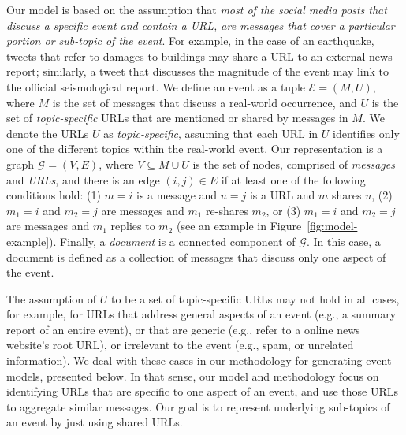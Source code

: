 Our model is based on the assumption that {\em most of the social media posts
that discuss a specific event and contain a URL, are messages that cover a
particular portion or sub-topic of the event}.
%
For example, in the case of an earthquake, tweets that refer to damages to
buildings may share a URL to an external news report; similarly, a tweet that
discusses the magnitude of the event may link to the official seismological
report.
%
We define an event as a tuple $\mathcal{E} = (M, U)$, where $M$ is the set of
messages that discuss a real-world occurrence, and $U$ is
the set of {\em topic-specific} URLs that are mentioned or shared by messages in
$M$. 
%
We denote the URLs $U$ as {\em topic-specific}, assuming that each URL in $U$
identifies only one of the different topics within the real-world event.
%
Our representation is a graph $\mathcal{G} = (V, E)$, where $V \subseteq M \cup
U$ is the set of nodes, comprised of {\em messages} and {\em URLs}, and there is
an edge $(i, j) \in E$ if at least one of the following conditions hold: (1)
$m=i$ is a message and $u=j$ is a URL and $m$ shares $u$, (2) $m_1=i$ and
$m_2=j$ are messages and $m_1$ re-shares $m_2$, or (3) $m_1=i$ and $m_2=j$ are
messages and $m_1$ replies to $m_2$ (see an example in
Figure~\ref{fig:model-example}).
%
Finally, a {\em document} is a connected component of $\mathcal{G}$.
%
In this case, a document is defined as a collection of messages that discuss
only one aspect of the event.


The assumption of $U$ to be a set of topic-specific URLs may not hold in all
cases, for example, for URLs that address general aspects of an event (e.g., a
summary report of an entire event), or that are generic (e.g., refer to a online
news website's root URL), or irrelevant to the event (e.g., spam, or unrelated
information).
%
We deal with these cases in our methodology for generating event models,
presented below.
%
In that sense, our model and methodology focus on identifying URLs that are
specific to one aspect of an event, and use those URLs to aggregate similar
messages.
%
Our goal is to represent underlying sub-topics of an event by just using shared
URLs. 




